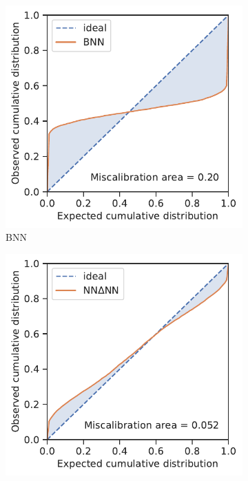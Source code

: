 \documentclass[]{achemso}
\begin{document}
\begin{figure}
\begin{subfigure}{0.32\textwidth}
        \includegraphics[width=\textwidth]{../BNN/calibration.pdf}
        \caption{\gls{BNN}}\label{fig:calibration_bnn}
    \end{subfigure}
    \begin{subfigure}{0.32\textwidth}
        \includegraphics[width=\textwidth]{../NNdNN/calibration.pdf}

\end{subfigure}
\end{figure}
\end{document}
